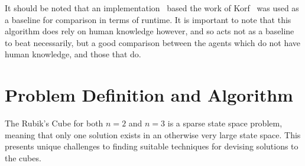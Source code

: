 \documentclass[UKenglish]{libraries/svproc}
\begin{document}
It should be noted that an implementation~\cite{Shoukat2019} based the work of Korf~\cite{KORF198597} was used as a baseline for comparison in terms of runtime. It is important to note that this algorithm does rely on human knowledge however, and so acts not as a baseline to beat necessarily, but a good comparison between the agents which do not have human knowledge, and those that do.


\section{Problem Definition and Algorithm}
The Rubik's Cube for both $n=2$ and $n=3$ is a sparse state space problem, meaning that only one solution exists in an otherwise very large state space. This presents unique challenges to finding suitable techniques for devising solutions to the cubes.
\end{document}
